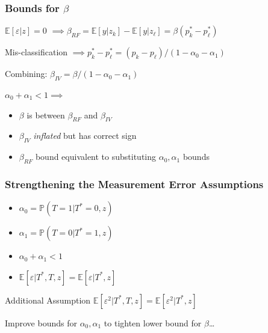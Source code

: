 \documentclass{beamer}
\begin{document}
\begin{frame}
  \frametitle{Bounds for $\beta$}
  \begin{block}{$\mathbb{E}[\varepsilon|z]=0$} 
    $\implies \beta_{RF} = \mathbb{E}[y|z_k] - \mathbb{E}[y|z_\ell] =\beta (p_k^* - p_\ell^*)$
  \end{block}

  \begin{block}{Mis-classification} 
  $\implies p_k^* - p_\ell^* = (p_k - p_\ell)/(1 - \alpha_0 - \alpha_1)$
  \end{block}

  \vspace{1em}

  \begin{alertblock}{Combining: $\beta_{IV} = \beta / (1 - \alpha_0 - \alpha_1)$}
  \end{alertblock}

  \vspace{-1em}

\begin{block}{$\alpha_0 + \alpha_1 < 1 \implies $}
  \begin{itemize}
    \item $\beta$ is between $\beta_{RF}$ and $\beta_{IV}$ 
    \item $\beta_{IV}$ \emph{inflated} but has correct sign 
    \item $\beta_{RF}$ bound equivalent to substituting $\alpha_0, \alpha_1$ bounds
  \end{itemize}
\end{block}
  
\end{frame}
\begin{frame}
  \frametitle{Strengthening the Measurement Error Assumptions}

  \begin{itemize}
    \item $\alpha_0 = \mathbb{P}(T=1|T^*=0, z)$
    \item $\alpha_1 = \mathbb{P}(T=0|T^*=1, z)$
    \item $\alpha_0 + \alpha_1 < 1$
    \item \alert{$\mathbb{E}[\varepsilon|T^*,T,z] = \mathbb{E}[\varepsilon|T^*,z]$}
  \end{itemize}


  \begin{block}{Additional Assumption}
    $\mathbb{E}[\varepsilon^2|T^*,T,z] = \mathbb{E}[\varepsilon^2|T^*,z]$
  \end{block}

  \vspace{1em}
  \hfill\alert{Improve bounds for $\alpha_0, \alpha_1$ to tighten lower bound for $\beta$\ldots}



  
\end{frame}
\end{document}
